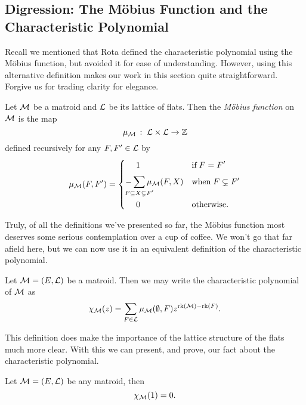 \documentclass[12pt,oneside]{../../sfsuthesis}
\begin{document}
\subsection{Digression: The M\"obius Function and the Characteristic Polynomial}
Recall we mentioned that Rota defined the characteristic polynomial using the M\"obius function, but avoided it for ease of understanding.
However, using this alternative definition makes our work in this section quite straightforward.
Forgive us for trading clarity for elegance.

\begin{definition}\label{def:mobiusFunc}
    Let \( \mathcal{M} \) be a matroid and \( \mathcal{L} \) be its lattice of flats.
    Then the \emph{M\"obius function} on \( \mathcal{M} \) is the map
    \[
        \mu_{\mathcal{M}} \,:\; \mathcal{L} \times \mathcal{L} \to \mathbb{Z}
    \]
    defined recursively for any \( F, F' \in \mathcal{L} \) by
    \[
        \mu_\cM(F, F') =
        \begin{dcases}
            \quad\; 1 \vphantom{\sum}                                    & \text{if}\; F = F'            \\
            - \sum_{\mathclap{F \subseteq X \subsetneq F'}}\mu_\cM(F, X) & \text{when}\; F \subsetneq F' \\
            \quad\; 0                                                    & \text{otherwise}.
        \end{dcases}
    \]
\end{definition}
Truly, of all the definitions we've presented so far, the M\"obius function most deserves some serious contemplation over a cup of coffee.
We won't go that far afield here, but we can now use it in an equivalent definition of the characteristic polynomial.
\begin{definition}
    Let \( \mathcal{M} = (E, \mathcal{L}) \) be a matroid.
    Then we may write the characteristic polynomial of \( \mathcal{M} \) as
    \[
        \chi_{\mathcal{M}}(z) = \sum_{F \in \mathcal{L}} \mu_{\mathcal{M}}(\emptyset, F) z^{\operatorname{rk}(\mathcal{M}) - \operatorname{rk}(F)}.
    \]
\end{definition}
This definition does make the importance of the lattice structure of the flats much more clear.
With this we can present, and prove, our fact about the characteristic polynomial.
\begin{proposition}\th\label{prop:charOfOneIsZero}
    Let \( \mathcal{M} = (E, \mathcal{L}) \) be any matroid, then
    \[
        \chi_{\mathcal{M}}(1) = 0.
    \]
\end{proposition}
\end{document}
